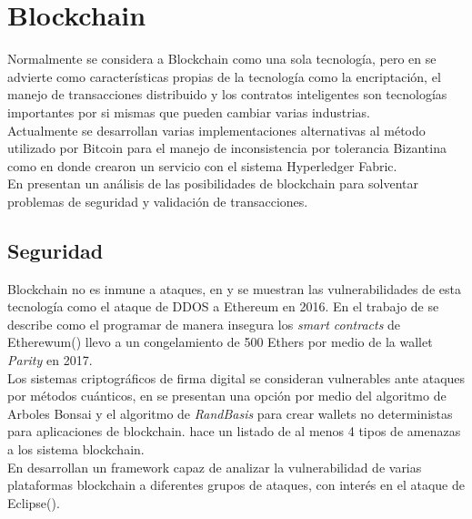 \documentclass[10pt,letterpaper]{article}
\begin{document}
\section{Blockchain}

Normalmente se considera a Blockchain como una sola tecnología, pero en \cite{halaburda2018blockchain} se advierte como características propias de la tecnología como la encriptación, el manejo de transacciones distribuido y los contratos inteligentes son tecnologías importantes por si mismas que pueden cambiar varias industrias.\\


Actualmente se desarrollan varias implementaciones alternativas al método utilizado por Bitcoin para el manejo de inconsistencia por tolerancia Bizantina  como en \cite{10.1145/3152824.3152830} donde crearon un servicio con el sistema Hyperledger Fabric\cite{bessani2014state}.\\

En \cite{puthal2018blockchain} presentan un análisis de las posibilidades de blockchain para solventar problemas de seguridad y validación de transacciones.\\

\subsection{Seguridad}

Blockchain no es inmune a ataques, en \cite{hasanova2019survey} y \cite{apostolaki2017hijacking}se muestran las vulnerabilidades de esta tecnología como el ataque de DDOS a Ethereum en 2016\cite{atzei2016survey}. En el trabajo de \cite{destefanis2018smart} se describe como el programar de manera insegura los \textit{smart contracts} de Etherewum(\cite{buterin2016ethereum}) llevo a un congelamiento de 500 Ethers por medio de la wallet \textit{Parity}\cite{Parity} en 2017.\\

Los sistemas criptográficos de firma digital se consideran vulnerables ante ataques por métodos cuánticos, en \cite{li2018new} se presentan una opción por medio del algoritmo de Arboles Bonsai\cite{cash2010bonsai}  y el algoritmo de \textit{RandBasis} para\cite{sciabarra2013ayn} crear wallets no deterministas para aplicaciones de blockchain. \cite{xu2016blockchains} hace un listado de al menos 4 tipos de amenazas a los sistema blockchain.\\

En \cite{gervais2016security} desarrollan un framework capaz de analizar la vulnerabilidad de varias plataformas blockchain a diferentes grupos de ataques, con interés en el ataque de Eclipse(\cite{wust2016ethereum}). \\
\end{document}
